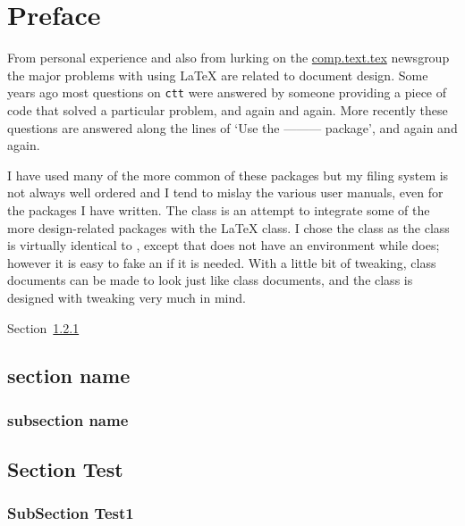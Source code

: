 \documentclass[10pt,a4paper,extrafontsizes]{memoir}
\begin{document}
\vspace*{\fill}

\cleardoublepage

\pagestyle{headings}

\setupshorttoc
\tableofcontents
\clearpage
\setupparasubsecs
\setupmaintoc
\tableofcontents
\setlength{\unitlength}{1pt}
\clearpage
\listoffigures
\clearpage
\listoftables
\clearpage
\listofegresults



\chapter{Preface}

    From personal experience and also from lurking on the \url{comp.text.tex}
newsgroup the major problems with using LaTeX are related to document
design. Some years ago most questions on \texttt{ctt} were answered by
someone providing a piece of code that solved a particular problem, and
again and again. More recently these questions are answered along the
lines of `Use the ---------{} package', and again and again.

    I have used many of the more common of these packages but my filing system
is not always well ordered and I tend to mislay the various user manuals,
even for the packages I have written. The  class is an attempt
to integrate some of the more design-related packages with the LaTeX
 class. I chose the  class as the  class
is virtually identical to , except that  does
not have an  environment while  does; however it is 
easy to fake an  if it is needed. With a little bit of tweaking,
 class documents can be made to look just like 
class documents, and the  class is designed with tweaking very
much in mind.


Section~\ref{sub:subsec1}

\section{section name} %
\label{sec:section_name}



\subsection{subsection name} %
\label{sub:subsection_name}


\section{Section Test}

\subsection{SubSection Test1}
\label{sub:subsec1}
\end{document}
